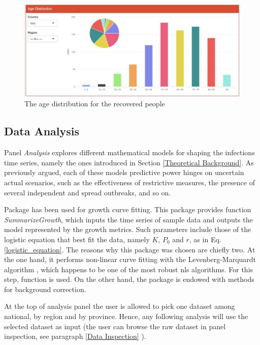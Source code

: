 \documentclass[
12pt, %
a4paper, %
oneside, %
headinclude,footinclude, %
BCOR5mm, %
]{scrartcl}
\begin{document}
\clearpage

\begin{figure}
  \centering
  \includegraphics[width=0.8\linewidth]{Figures/Age_distribution.jpg} 
  \caption{The age distribution for the recovered people}
  \label{fig:Age_distribution}
\end{figure}\hspace{0.3\textwidth}


\subsection{Data Analysis}\label{sub:Data Analysis}

Panel \textit{Analysis} explores different mathematical models for shaping the infection\textquotesingle s time series, namely the ones introduced in Section \ref{Theoretical Background}. As previously argued, each of these model\textquotesingle s predictive power hinges on uncertain actual scenarios, such as the effectiveness of restrictive measures, the presence of several independent and spread outbreaks, and so on.

Package  \cite{growthcurver} has been used for growth curve fitting. This package provides function  \textit{SummarizeGrowth}, which inputs the time series of sample data and outputs the model represented by the growth metrics. Such parameters include those of the logistic equation that best fit the data, namely $K$, $P_0$ and $r$, as in Eq.\ref{logistic_equation}.
The reasons why this package was chosen are chiefly two. At the one hand, it performs non-linear curve fitting with the Levenberg-Marquardt algorithm \cite{more1978levenberg} , which happens to be one of the most robust nls algorithms. For this step, function \cite{nlsLM}  is used. On the other hand, the package is endowed with methods for background correction.


At the top of analysis panel the user is allowed to pick one dataset among national, by region and by province. Hence, any following analysis will use the selected dataset as input (the user can browse the raw dataset in panel inspection, see paragraph \ref{Data Inspection} ).
\end{document}
